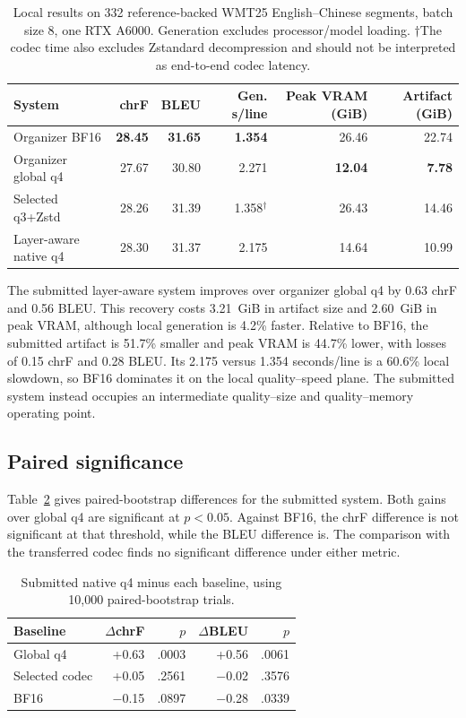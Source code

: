 \documentclass[11pt]{article}
\begin{document}
\begin{table}[t]
\centering
\small
\begin{tabular}{lrrrrr}
\toprule
System & chrF & BLEU & Gen. s/line & Peak VRAM (GiB) & Artifact (GiB) \\
\midrule
Organizer BF16 & \textbf{28.45} & \textbf{31.65} & \textbf{1.354} & 26.46 & 22.74 \\
Organizer global q4 & 27.67 & 30.80 & 2.271 & \textbf{12.04} & \textbf{7.78} \\
Selected q3+Zstd & 28.26 & 31.39 & 1.358$^{\dagger}$ & 26.43 & 14.46 \\
Layer-aware native q4 & 28.30 & 31.37 & 2.175 & 14.64 & 10.99 \\
\bottomrule
\end{tabular}
\caption{Local results on 332 reference-backed WMT25 English--Chinese segments, batch size 8, one RTX A6000. Generation excludes processor/model loading. $\dagger$The codec time also excludes Zstandard decompression and should not be interpreted as end-to-end codec latency.}
\label{tab:main-results}
\end{table}

The submitted layer-aware system improves over organizer global q4 by 0.63 chrF and 0.56 BLEU. This recovery costs 3.21~GiB in artifact size and 2.60~GiB in peak VRAM, although local generation is 4.2\% faster. Relative to BF16, the submitted artifact is 51.7\% smaller and peak VRAM is 44.7\% lower, with losses of 0.15 chrF and 0.28 BLEU. Its 2.175 versus 1.354 seconds/line is a 60.6\% local slowdown, so BF16 dominates it on the local quality--speed plane. The submitted system instead occupies an intermediate quality--size and quality--memory operating point.

\subsection{Paired significance}

Table~\ref{tab:significance} gives paired-bootstrap differences for the submitted system. Both gains over global q4 are significant at $p<0.05$. Against BF16, the chrF difference is not significant at that threshold, while the BLEU difference is. The comparison with the transferred codec finds no significant difference under either metric.

\begin{table}[t]
\centering
\small
\begin{tabular}{@{}lrrrr@{}}
\toprule
Baseline & $\Delta$chrF & $p$ & $\Delta$BLEU & $p$ \\
\midrule
Global q4 & +0.63 & .0003 & +0.56 & .0061 \\
Selected codec & +0.05 & .2561 & $-$0.02 & .3576 \\
BF16 & $-$0.15 & .0897 & $-$0.28 & .0339 \\
\bottomrule
\end{tabular}
\caption{Submitted native q4 minus each baseline, using 10,000 paired-bootstrap trials.}
\label{tab:significance}
\end{table}
\end{document}
